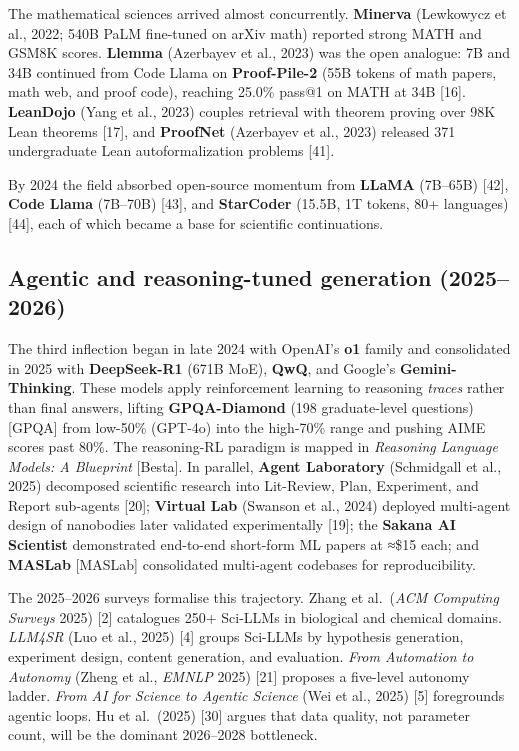 The mathematical sciences arrived almost concurrently. \textbf{Minerva} (Lewkowycz et al., 2022; 540B PaLM fine-tuned on arXiv math) reported strong MATH and GSM8K scores. \textbf{Llemma} (Azerbayev et al., 2023) was the open analogue: 7B and 34B continued from Code Llama on \textbf{Proof-Pile-2} (55B tokens of math papers, math web, and proof code), reaching 25.0\% pass@1 on MATH at 34B {[}16{]}. \textbf{LeanDojo} (Yang et al., 2023) couples retrieval with theorem proving over 98K Lean theorems {[}17{]}, and \textbf{ProofNet} (Azerbayev et al., 2023) released 371 undergraduate Lean autoformalization problems {[}41{]}.

By 2024 the field absorbed open-source momentum from \textbf{LLaMA} (7B--65B) {[}42{]}, \textbf{Code Llama} (7B--70B) {[}43{]}, and \textbf{StarCoder} (15.5B, 1T tokens, 80+ languages) {[}44{]}, each of which became a base for scientific continuations.

\subsection{Agentic and reasoning-tuned generation (2025--2026)}\label{agentic-and-reasoning-tuned-generation-20252026}

The third inflection began in late 2024 with OpenAI's \textbf{o1} family and consolidated in 2025 with \textbf{DeepSeek-R1} (671B MoE), \textbf{QwQ}, and Google's \textbf{Gemini-Thinking}. These models apply reinforcement learning to reasoning \emph{traces} rather than final answers, lifting \textbf{GPQA-Diamond} (198 graduate-level questions) {[}GPQA{]} from low-50\% (GPT-4o) into the high-70\% range and pushing AIME scores past 80\%. The reasoning-RL paradigm is mapped in \emph{Reasoning Language Models: A Blueprint} {[}Besta{]}. In parallel, \textbf{Agent Laboratory} (Schmidgall et al., 2025) decomposed scientific research into Lit-Review, Plan, Experiment, and Report sub-agents {[}20{]}; \textbf{Virtual Lab} (Swanson et al., 2024) deployed multi-agent design of nanobodies later validated experimentally {[}19{]}; the \textbf{Sakana AI Scientist} demonstrated end-to-end short-form ML papers at ≈\$15 each; and \textbf{MASLab} {[}MASLab{]} consolidated multi-agent codebases for reproducibility.

The 2025--2026 surveys formalise this trajectory. Zhang et al.~(\emph{ACM Computing Surveys} 2025) {[}2{]} catalogues 250+ Sci-LLMs in biological and chemical domains. \emph{LLM4SR} (Luo et al., 2025) {[}4{]} groups Sci-LLMs by hypothesis generation, experiment design, content generation, and evaluation. \emph{From Automation to Autonomy} (Zheng et al., \emph{EMNLP} 2025) {[}21{]} proposes a five-level autonomy ladder. \emph{From AI for Science to Agentic Science} (Wei et al., 2025) {[}5{]} foregrounds agentic loops. Hu et al.~(2025) {[}30{]} argues that data quality, not parameter count, will be the dominant 2026--2028 bottleneck.

